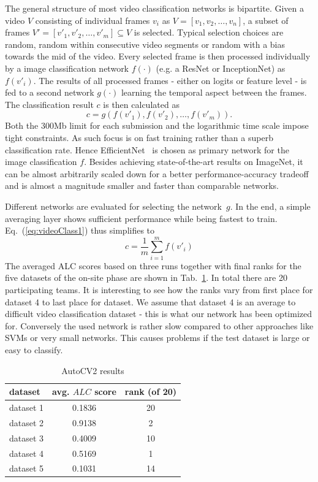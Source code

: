 \documentclass{article}
\begin{document}
The general structure of most video classification networks is bipartite. Given a video $V$ consisting of individual frames $v_i$ as $V = [v_1, v_2, \ldots, v_n]$, a subset of frames $V' = [v'_1, v'_2, \ldots, v'_m] \subseteq V$ is selected. Typical selection choices are random, random within consecutive video segments or random with a bias towards the mid of the video. Every selected frame is then processed individually by a image classification network $f(\cdot)$ (e.g. a ResNet or InceptionNet) as $f(v'_i)$. The results of all processed frames - either on logits or feature level - is fed to a second network $g(\cdot)$ learning the temporal aspect between the frames. The classification result $c$ is then calculated as 
%
\begin{equation}
c = g\left(f(v'_1), f(v'_2), \ldots, f(v'_m) \right).
\label{eq:videoClass1}
\end{equation}
%
Both the 300Mb limit for each submission and the logarithmic time scale impose tight constraints. As such focus is on fast training rather than a superb classification rate. Hence EfficientNet~\cite{tan19} is chosen as primary network for the image classification $f$. Besides achieving state-of-the-art results on ImageNet, it can be almost arbitrarily scaled down for a better performance-accuracy tradeoff and is almost a magnitude smaller and faster than comparable networks. 

Different networks are evaluated for selecting the network~$g$. In the end, a simple averaging layer shows sufficient performance while being fastest to train. Eq.~(\ref{eq:videoClass1}) thus simplifies to 
%
\begin{equation}
c = \frac{1}{m}\sum\limits_{i=1}^m f(v'_i)
\label{eq:videoClass2}
\end{equation}
%
The averaged ALC scores based on three runs together with final ranks for the five datasets of the on-site phase are shown in Tab.~\ref{table:autocv2}. In total there are 20 participating teams. It is interesting to see how the ranks vary from first place for dataset 4 to last place for dataset. We assume that dataset 4 is an average to difficult video classification dataset - this is what our network has been optimized for. Conversely the used network is rather slow compared to other approaches like SVMs or very small networks. This causes problems if the test dataset is large or easy to classify. 
%
\begin{table}
\center
\begin{tabular}{|l|c|c|}
\hline
dataset & avg. $ALC$ score & rank (of 20) \\
\hline
dataset 1 & 0.1836 & 20 \\
dataset 2 & 0.9138 & 2  \\
dataset 3 & 0.4009 & 10 \\
dataset 4 & 0.5169 & 1  \\
dataset 5 & 0.1031 & 14 \\
\hline
\end{tabular}
\normalsize
\caption{AutoCV2 results}
\label{table:autocv2}
\end{table}
\end{document}

